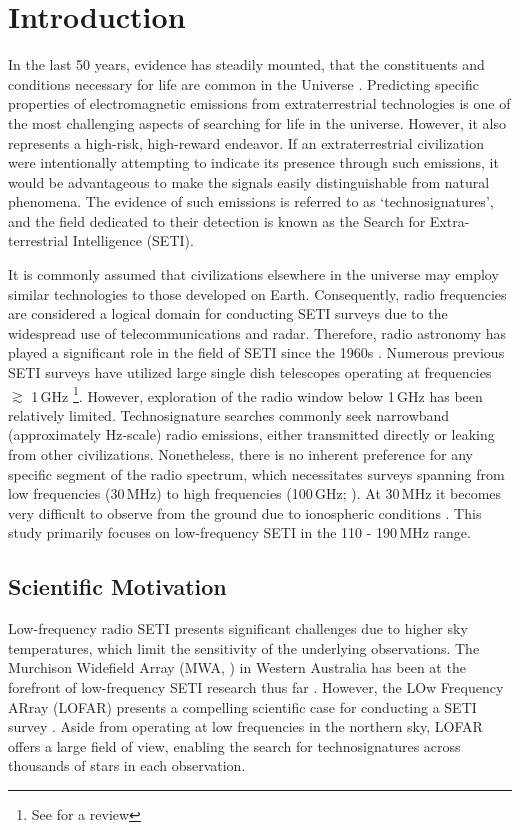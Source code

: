 \section{Introduction}
\label{sect:intro}

In the last 50 years, evidence has steadily mounted, that the constituents and conditions necessary for life are common in the Universe \citep{Wordsworth2014}. Predicting specific properties of electromagnetic emissions from extraterrestrial technologies is one of the most challenging aspects of searching for life in the universe. However, it also represents a high-risk, high-reward endeavor. If an extraterrestrial civilization were intentionally attempting to indicate its presence through such emissions, it would be advantageous to make the signals easily distinguishable from natural phenomena. The evidence of such emissions is referred to as `technosignatures', and the field dedicated to their detection is known as the Search for Extra-terrestrial Intelligence (SETI).


It is commonly assumed that civilizations elsewhere in the universe may employ similar technologies to those developed on Earth. Consequently, radio frequencies are considered a logical domain for conducting SETI surveys due to the widespread use of telecommunications and radar. Therefore, radio astronomy has played a significant role in the field of SETI since the 1960s \citep{Drake:1961bv, Tarter:1980p1516}. Numerous previous SETI surveys have utilized large single dish telescopes operating at frequencies $\gtrsim$ 1\,GHz \citep{Tarter:1996jf, Siemion_KEPLER_ApJ, Enriquez:2017} \footnote{See \citealt{wright18} for a review}. However, exploration of the radio window below 1\,GHz has been relatively limited. Technosignature searches commonly seek narrowband (approximately Hz-scale) radio emissions, either transmitted directly or leaking from other civilizations. Nonetheless, there is no inherent preference for any specific segment of the radio spectrum, which necessitates surveys spanning from low frequencies (30\,MHz) to high frequencies (100\,GHz; \citealt{Cherry_2022}). At 30\,MHz it becomes very difficult to observe from the ground due to ionospheric conditions \citep[see][chap.~7.8]{burke_graham-smith_wilkinson_2019}. This study primarily focuses on low-frequency SETI in the 110 - 190\,MHz range.

\subsection{Scientific Motivation}
Low-frequency radio SETI presents significant challenges due to higher sky temperatures, which limit the sensitivity of the underlying observations. The Murchison Widefield Array (MWA, \citealt{2013PASA...30....7T}) in Western Australia has been at the forefront of low-frequency SETI research thus far \citep{tingay:center,tingay:anticenter,tingay:omm}. However, the LOw Frequency ARray (LOFAR) presents a compelling scientific case for conducting a SETI survey \citep{Eavesdropping}. Aside from operating at low frequencies in the northern sky, LOFAR offers a large field of view, enabling the search for technosignatures across thousands of stars in each observation. 

